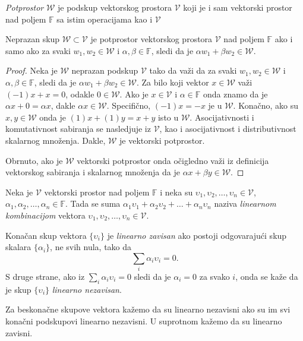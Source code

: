 \documentclass{article}
\begin{document}
\begin{definition}
  \textit{Potprostor} $\mathcal{W}$ je podskup vektorskog prostora $\mathcal{V}$ koji je i sam vektorski prostor nad poljem $\mathbb{F}$ sa istim operacijama kao i $\mathcal{V}$
\end{definition}

\begin{theorem}
  Neprazan skup $\mathcal{W} \subset \mathcal{V}$ je potprostor vektorskog prostora $\mathcal{V}$ nad poljem $\mathbb{F}$ ako i samo ako za svaki $w_1, w_2 \in \mathcal{W}$ i $\alpha, \beta \in \mathbb{F}$, sledi da je $\alpha w_1 + \beta w_2 \in \mathcal{W}$.
\end{theorem}

\begin{proof}
  Neka je $\mathcal{W}$ neprazan podskup $\mathcal{V}$ tako da važi da za svaki $w_1, w_2 \in \mathcal{W}$ i $\alpha, \beta \in \mathbb{F}$, sledi da je $\alpha w_1 + \beta w_2 \in \mathcal{W}$.
  Za bilo koji vektor $x \in \mathcal{W}$ važi $(-1) x + x = 0$, odakle $0 \in \mathcal{W}$.
  Ako je $x \in \mathcal{V}$ i $\alpha \in \mathbb{F}$ onda znamo da je $\alpha x + 0 = \alpha x$, dakle $\alpha x \in \mathcal{W}$.
  Specifično, $(-1) x = -x$ je u $\mathcal{W}$.
  Konačno, ako su $x, y \in \mathcal{W}$ onda je $(1) x + (1) y = x + y$ isto u $\mathcal{W}$.
  Asocijativnosti i komutativnost sabiranja se nasledjuje iz $\mathcal{V}$, kao i asocijativnost i distributivnost skalarnog množenja.
  Dakle, $\mathcal{W}$ je vektorski potprostor.

  Obrnuto, ako je $\mathcal{W}$ vektorski potprostor onda očigledno važi iz definicija vektorskog sabiranja i skalarnog množenja da je $\alpha x + \beta y \in \mathcal{W}$.
\end{proof}

\begin{definition}
  Neka je $\mathcal{V}$ vektorski prostor nad poljem $\mathbb{F}$ i neka su $\upsilon_1, \upsilon_2, \ldots, \upsilon_n \in \mathcal{V}$, $\alpha_1, \alpha_2, \ldots, \alpha_n \in \mathbb{F}$.
  Tada se suma $\alpha_1 \upsilon_1 + \alpha_2 \upsilon_2 + \ldots + \alpha_n \upsilon_n$ naziva \textit{linearnom kombinacijom} vektora $\upsilon_1, \upsilon_2, \ldots, \upsilon_n \in \mathcal{V}$.
\end{definition}

\begin{definition}
  Konačan skup vektora $\{\upsilon_i\}$ je \textit{linearno zavisan} ako postoji odgovarajući skup skalara $\{\alpha_i\}$, ne svih nula, tako da
  \[\sum_{i} \alpha_i \upsilon_i = 0.\]
  S druge strane, ako iz $\sum_{i} \alpha_i \upsilon_i = 0$ sledi da je $\alpha_i = 0$ za svako $i$, onda se kaže da je skup $\{\upsilon_i\}$ \textit{linearno nezavisan}.
  
  Za beskonačne skupove vektora kažemo da su linearno nezavisni ako su im svi konačni podskupovi linearno nezavisni.
  U suprotnom kažemo da su linearno zavisni.
\end{definition}
\end{document}
